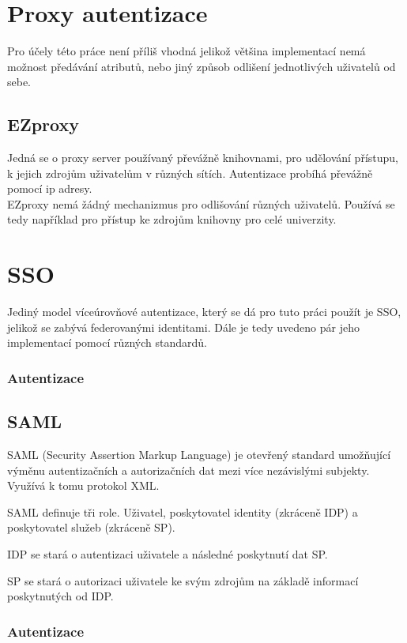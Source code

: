 \chapter{Proxy autentizace}
Pro účely této práce není příliš vhodná jelikož většina implementací nemá možnost předávání atributů, nebo jiný způsob odlišení jednotlivých uživatelů od sebe.

\section{EZproxy}
Jedná se o proxy server používaný převážně knihovnami, pro udělování přístupu, k jejich zdrojům uživatelům v různých sítích. Autentizace probíhá převážně pomocí ip adresy.\\
EZproxy nemá žádný mechanizmus pro odlišování různých uživatelů. Používá se tedy například pro přístup ke zdrojům knihovny pro celé univerzity. \cite{EZproxy}\cite{wikiEZproxy}

\chapter{SSO}
Jediný model víceúrovňové autentizace, který se dá pro tuto práci použít je SSO, jelikož se zabývá federovanými identitami.
Dále je tedy uvedeno pár jeho implementací pomocí různých standardů. 

\subsection{Autentizace}

\section{SAML}

SAML\cite{SAMLofficialSite}\cite{WhatIsSaml} (Security Assertion Markup Language) je otevřený standard umožňující výměnu autentizačních a autorizačních dat mezi více nezávislými subjekty. Využívá k tomu protokol XML. 

SAML definuje tři role. Uživatel, poskytovatel identity (zkráceně IDP) a poskytovatel služeb (zkráceně SP). 

IDP se stará o autentizaci uživatele a následné poskytnutí dat SP.

SP se stará o autorizaci uživatele ke svým zdrojům na základě informací poskytnutých od IDP.

\subsection{Autentizace}



